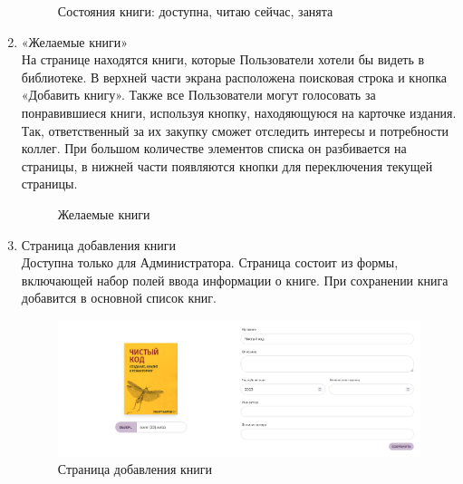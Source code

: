 \documentclass[project.tex]{subfiles}
\begin{document}
\begin{enumerate}
\begin{figure}[H]
       \caption{Состояния книги: доступна, читаю сейчас, занята} 
    \end{figure}
    \item «Желаемые книги»\\
    На странице находятся книги, которые Пользователи хотели бы видеть в библиотеке. В верхней части экрана расположена поисковая строка и кнопка «Добавить книгу». Также все Пользователи могут голосовать за понравившиеся книги, используя кнопку, находяющуюся на карточке издания. Так, ответственный за их закупку сможет отследить интересы и потребности коллег. 
    При большом количестве элементов списка он разбивается на страницы, в нижней части появляются кнопки для переключения текущей страницы.
    \begin{figure}[H]
       \label{pic:desired}
       \caption{Желаемые книги} 
    \end{figure}
    \item Страница добавления книги\\
    Доступна только для Администратора. Страница состоит из формы, включающей набор полей ввода информации о книге. При сохранении книга добавится в основной список книг.
    \begin{figure}[H]
       \includegraphics[width=\textwidth, frame]{../../graphics/bookform.png}
       \caption{Страница добавления книги} 
       \label{pic:form}
    \end{figure}

\end{enumerate}
\end{document}
